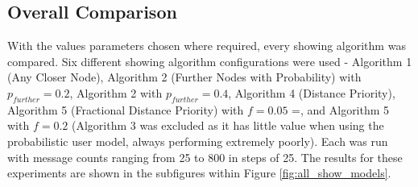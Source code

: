 \documentclass[bsc,frontabs,twoside,singlespacing,parskip,deptreport]{infthesis}     %
\begin{document}
\subsection{Overall Comparison} \label{subsec:all_show_models_results}
With the values parameters chosen where required, every showing algorithm was compared. Six different showing algorithm configurations were used - Algorithm 1 (Any Closer Node), Algorithm 2 (Further Nodes with Probability) with $p_{further}=0.2$, Algorithm 2 with $p_{further}=0.4$, Algorithm 4 (Distance Priority), Algorithm 5 (Fractional Distance Priority) with $f=0.05$ =, and Algorithm 5 with $f=0.2$ (Algorithm 3 was excluded as it has little value when using the probabilistic user model, always performing extremely poorly). Each was run with message counts ranging from 25 to 800 in steps of 25. The results for these experiments are shown in the subfigures within Figure \ref{fig:all_show_models}.
\end{document}
